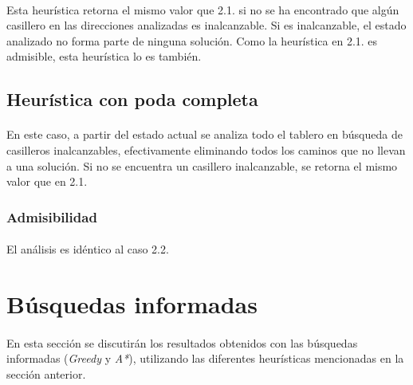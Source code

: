 \documentclass[12pt, twocolumn]{article}
\begin{document}
	\paragraph{} Esta heurística retorna el mismo valor que 2.1. si no se ha encontrado que algún casillero en las direcciones analizadas es inalcanzable. Si es inalcanzable, el estado analizado no forma parte de ninguna solución. Como la heurística en 2.1. es admisible, esta heurística lo es también.  
	
	\subsection{Heurística con poda completa}
	
	\paragraph{} En este caso, a partir del estado actual se analiza todo el tablero en búsqueda de casilleros inalcanzables, efectivamente eliminando todos los caminos que no llevan a una solución. Si no se encuentra un casillero inalcanzable, se retorna el mismo valor que en 2.1.
	
	\subsubsection{Admisibilidad}
	
	\paragraph{} El análisis es idéntico al caso 2.2.
	
	\section{Búsquedas informadas}
	
	\paragraph{} En esta sección se discutirán los resultados obtenidos con las búsquedas informadas (\textit{Greedy} y \textit{A*}), utilizando las diferentes heurísticas mencionadas en la sección anterior. 
	
	
	
	
	
	
\end{document}
